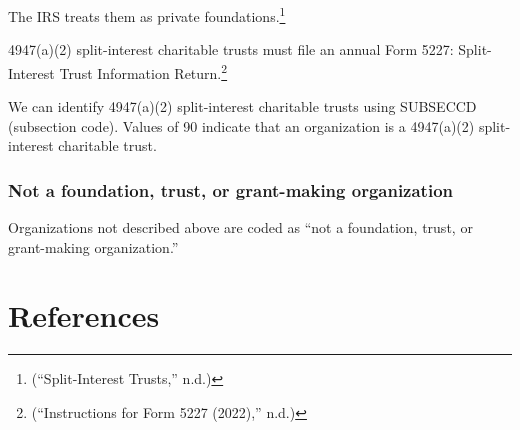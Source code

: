 \documentclass[
  letterpaper,
  DIV=11,
  numbers=noendperiod,
  oneside]{scrreprt}
\begin{document}
The IRS treats them as private foundations.\footnote{({``Split-Interest
  Trusts,''} n.d.)}

4947(a)(2) split-interest charitable trusts must file an annual Form
5227: Split-Interest Trust Information Return.\footnote{({``Instructions
  for Form 5227 (2022),''} n.d.)}

We can identify 4947(a)(2) split-interest charitable trusts using
SUBSECCD (subsection code). Values of 90 indicate that an organization
is a 4947(a)(2) split-interest charitable trust.

\hypertarget{not-a-foundation-trust-or-grant-making-organization}{%
\subsection{Not a foundation, trust, or grant-making
organization}\label{not-a-foundation-trust-or-grant-making-organization}}

Organizations not described above are coded as ``not a foundation,
trust, or grant-making organization.''


\hypertarget{references}{%
\chapter*{References}\label{references}}

\end{document}
